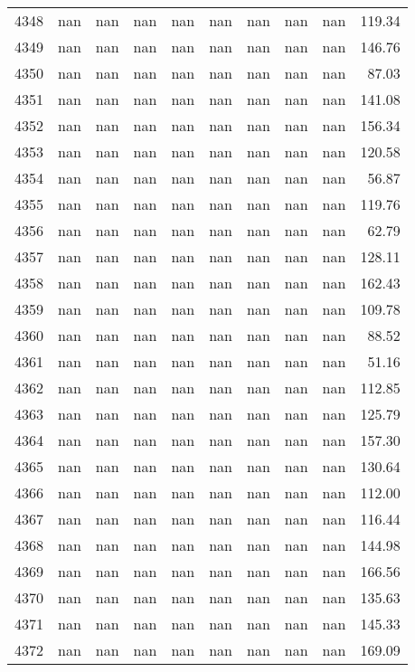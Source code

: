\begin{tabular}{lrrrrrrrrr}
4348 & nan & nan & nan & nan & nan & nan & nan & nan & 119.34 \\
4349 & nan & nan & nan & nan & nan & nan & nan & nan & 146.76 \\
4350 & nan & nan & nan & nan & nan & nan & nan & nan & 87.03 \\
4351 & nan & nan & nan & nan & nan & nan & nan & nan & 141.08 \\
4352 & nan & nan & nan & nan & nan & nan & nan & nan & 156.34 \\
4353 & nan & nan & nan & nan & nan & nan & nan & nan & 120.58 \\
4354 & nan & nan & nan & nan & nan & nan & nan & nan & 56.87 \\
4355 & nan & nan & nan & nan & nan & nan & nan & nan & 119.76 \\
4356 & nan & nan & nan & nan & nan & nan & nan & nan & 62.79 \\
4357 & nan & nan & nan & nan & nan & nan & nan & nan & 128.11 \\
4358 & nan & nan & nan & nan & nan & nan & nan & nan & 162.43 \\
4359 & nan & nan & nan & nan & nan & nan & nan & nan & 109.78 \\
4360 & nan & nan & nan & nan & nan & nan & nan & nan & 88.52 \\
4361 & nan & nan & nan & nan & nan & nan & nan & nan & 51.16 \\
4362 & nan & nan & nan & nan & nan & nan & nan & nan & 112.85 \\
4363 & nan & nan & nan & nan & nan & nan & nan & nan & 125.79 \\
4364 & nan & nan & nan & nan & nan & nan & nan & nan & 157.30 \\
4365 & nan & nan & nan & nan & nan & nan & nan & nan & 130.64 \\
4366 & nan & nan & nan & nan & nan & nan & nan & nan & 112.00 \\
4367 & nan & nan & nan & nan & nan & nan & nan & nan & 116.44 \\
4368 & nan & nan & nan & nan & nan & nan & nan & nan & 144.98 \\
4369 & nan & nan & nan & nan & nan & nan & nan & nan & 166.56 \\
4370 & nan & nan & nan & nan & nan & nan & nan & nan & 135.63 \\
4371 & nan & nan & nan & nan & nan & nan & nan & nan & 145.33 \\
4372 & nan & nan & nan & nan & nan & nan & nan & nan & 169.09 \\

\end{tabular}
